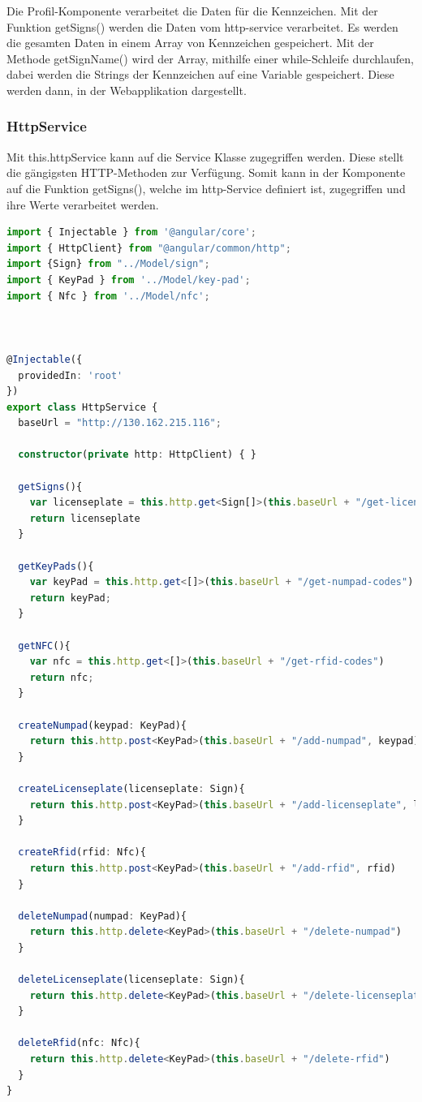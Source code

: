 Die Profil-Komponente verarbeitet die Daten für die Kennzeichen. Mit der Funktion getSigns() werden die Daten vom http-service verarbeitet. Es werden die gesamten Daten in einem Array von Kennzeichen gespeichert. Mit der Methode getSignName() wird der Array, mithilfe einer while-Schleife durchlaufen, dabei werden die Strings der Kennzeichen auf eine Variable gespeichert. Diese werden dann, in der Webapplikation dargestellt.

\subsubsection{HttpService}
Mit this.httpService kann auf die Service Klasse zugegriffen werden. Diese stellt die gängigsten HTTP-Methoden zur Verfügung. Somit kann in der Komponente auf die Funktion getSigns(), welche im http-Service definiert ist, zugegriffen und ihre Werte verarbeitet werden. 
\cite{HttpService}

\begin{lstlisting}[language=typeScript, caption=http.service.ts]
    import { Injectable } from '@angular/core';
import { HttpClient} from "@angular/common/http";
import {Sign} from "../Model/sign";
import { KeyPad } from '../Model/key-pad';
import { Nfc } from '../Model/nfc';



@Injectable({
  providedIn: 'root'
})
export class HttpService {
  baseUrl = "http://130.162.215.116";

  constructor(private http: HttpClient) { }

  getSigns(){
    var licenseplate = this.http.get<Sign[]>(this.baseUrl + "/get-licenseplates")
    return licenseplate
  }

  getKeyPads(){
    var keyPad = this.http.get<[]>(this.baseUrl + "/get-numpad-codes")
    return keyPad;
  }

  getNFC(){
    var nfc = this.http.get<[]>(this.baseUrl + "/get-rfid-codes")
    return nfc;
  }

  createNumpad(keypad: KeyPad){
    return this.http.post<KeyPad>(this.baseUrl + "/add-numpad", keypad)
  }

  createLicenseplate(licenseplate: Sign){
    return this.http.post<KeyPad>(this.baseUrl + "/add-licenseplate", licenseplate)
  }

  createRfid(rfid: Nfc){
    return this.http.post<KeyPad>(this.baseUrl + "/add-rfid", rfid)
  }

  deleteNumpad(numpad: KeyPad){
    return this.http.delete<KeyPad>(this.baseUrl + "/delete-numpad")
  }

  deleteLicenseplate(licenseplate: Sign){
    return this.http.delete<KeyPad>(this.baseUrl + "/delete-licenseplate")
  }

  deleteRfid(nfc: Nfc){
    return this.http.delete<KeyPad>(this.baseUrl + "/delete-rfid")
  }
}
\end{lstlisting}

